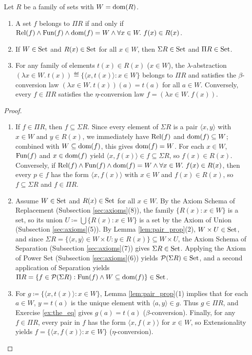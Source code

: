 \documentclass[10pt,a4paper]{article}
\renewcommand{\myprf}{\begin{proof}}
\renewcommand{\myqed}{\end{proof}}
\begin{document}
\begin{lemma}\label{lem:sigma_pi}
Let $R$ be a family of sets with $W = {\textrm{dom}}(R)$.
\begin{enumerate}
\item A set $f$ belongs to $\Pi R$ if and only if ${\textrm{Rel}}(f) \land {\textrm{Fun}}(f) \land {\textrm{dom}}(f) = W \land \forall x \in W.\ f(x) \in R(x)$.
\item If $W \in {\textrm{Set}}$ and $R(x) \in {\textrm{Set}}$ for all $x \in W$, then $\Sigma R \in {\textrm{Set}}$ and $\Pi R \in {\textrm{Set}}$.
\item For any family of elements $t(x) \in R(x)$ ($x \in W$), the $\lambda$-abstraction $(\lambda x \in W.\ t(x)) \eqdef \{\langle x, t(x) \rangle : x \in W\}$ belongs to $\Pi R$ and satisfies the $\beta$-conversion law $(\lambda x \in W.\ t(x))(a) = t(a)$ for all $a \in W$. Conversely, every $f \in \Pi R$ satisfies the $\eta$-conversion law $f = (\lambda x \in W.\ f(x))$.
\end{enumerate}
\end{lemma}
\myprf
\begin{enumerate}
\item If $f \in \Pi R$, then $f \subseteq \Sigma R$. Since every element of $\Sigma R$ is a pair $\langle x, y \rangle$ with $x \in W$ and $y \in R(x)$, we immediately have ${\textrm{Rel}}(f)$ and ${\textrm{dom}}(f) \subseteq W$; combined with $W \subseteq {\textrm{dom}}(f)$, this gives ${\textrm{dom}}(f) = W$. For each $x \in W$, ${\textrm{Fun}}(f)$ and $x \in {\textrm{dom}}(f)$ yield $\langle x, f(x) \rangle \in f \subseteq \Sigma R$, so $f(x) \in R(x)$. Conversely, if ${\textrm{Rel}}(f) \land {\textrm{Fun}}(f) \land {\textrm{dom}}(f) = W \land \forall x \in W.\ f(x) \in R(x)$, then every $p \in f$ has the form $\langle x, f(x) \rangle$ with $x \in W$ and $f(x) \in R(x)$, so $f \subseteq \Sigma R$ and $f \in \Pi R$.
\item Assume $W \in {\textrm{Set}}$ and $R(x) \in {\textrm{Set}}$ for all $x \in W$. By the Axiom Schema of Replacement (Subsection \ref{sec:axioms}(8)), the family $\{R(x) : x \in W\}$ is a set, so its union $U \coloneqq \bigcup \{R(x) : x \in W\}$ is a set by the Axiom of Union (Subsection \ref{sec:axioms}(5)). By Lemma \ref{lem:pair_prop}(2), $W \times U \in {\textrm{Set}}$, and since $\Sigma R = \{\langle x, y \rangle \in W \times U : y \in R(x)\} \subseteq W \times U$, the Axiom Schema of Separation (Subsection \ref{sec:axioms}(7)) gives $\Sigma R \in {\textrm{Set}}$. Applying the Axiom of Power Set (Subsection \ref{sec:axioms}(6)) yields ${\mathcal{P}}(\Sigma R) \in {\textrm{Set}}$, and a second application of Separation yields $\Pi R = \{f \in {\mathcal{P}}(\Sigma R) : {\textrm{Fun}}(f) \land W \subseteq {\textrm{dom}}(f)\} \in {\textrm{Set}}$.
\item For $g \coloneqq \{\langle x, t(x) \rangle : x \in W\}$, Lemma \ref{lem:pair_prop}(1) implies that for each $a \in W$, $y = t(a)$ is the unique element with $\langle a, y \rangle \in g$. Thus $g \in \Pi R$, and Exercise \ref{ex:the_eq} gives $g(a) = t(a)$ ($\beta$-conversion). Finally, for any $f \in \Pi R$, every pair in $f$ has the form $\langle x, f(x) \rangle$ for $x \in W$, so Extensionality yields $f = \{\langle x, f(x) \rangle : x \in W\}$ ($\eta$-conversion).
\end{enumerate}
\myqed
\end{document}
